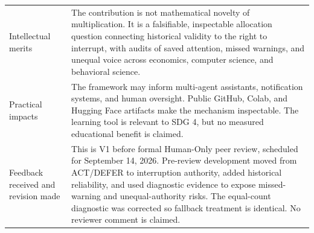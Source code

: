 \begin{table}[H]
\begin{tabularx}{\textwidth}{@{}p{}Y@{}}
Intellectual merits & The contribution is not mathematical novelty of multiplication. It is a falsifiable, inspectable allocation question connecting historical validity to the right to interrupt, with audits of saved attention, missed warnings, and unequal voice across economics, computer science, and behavioral science. \\
Practical impacts & The framework may inform multi-agent assistants, notification systems, and human oversight. Public GitHub, Colab, and Hugging Face artifacts make the mechanism inspectable. The learning tool is relevant to SDG 4, but no measured educational benefit is claimed. \\
Feedback received and revision made & This is V1 before formal Human-Only peer review, scheduled for September 14, 2026. Pre-review development moved from ACT/DEFER to interruption authority, added historical reliability, and used diagnostic evidence to expose missed-warning and unequal-authority risks. The equal-count diagnostic was corrected so fallback treatment is identical. No reviewer comment is claimed. \\
\bottomrule
\end{tabularx}
\end{table}
